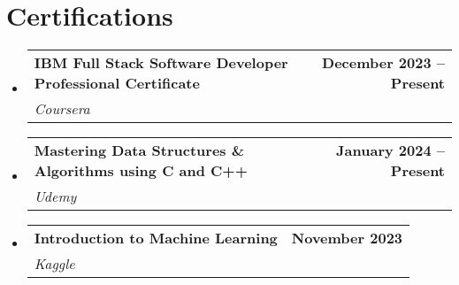 \documentclass[a4,11pt]{article}
\makeatletter
\newcommand{\resumeSubheading}[4]{
  \vspace{-2pt}\item
    \begin{tabular*}{1.0\textwidth}[t]{l@{\extracolsep{\fill}}r}
      \textbf{#1} & \textbf{\small #2} \\
      \textit{\small#3} & \textit{\small #4} \\
    \end{tabular*}\vspace{-7pt}
}
\newcommand{\resumeSubHeadingListStart}{\begin{itemize}[leftmargin=0.0in, label={}]}
\newcommand{\resumeSubHeadingListEnd}{\end{itemize}}
\makeatother
\begin{document}
\section{Certifications}
    \resumeSubHeadingListStart
        \resumeSubheading{IBM Full Stack Software Developer Professional Certificate}{December 2023 -- Present}{Coursera}{}
        \resumeSubheading{Mastering Data Structures \& Algorithms using C and C++}{January 2024 -- Present}{Udemy}{}
        \resumeSubheading{Introduction to Machine Learning}{November 2023}{Kaggle}{}
    \resumeSubHeadingListEnd
\end{document}
